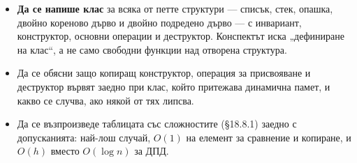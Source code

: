 \begin{itemize}
    \item \textbf{Да се напише клас} за всяка от петте структури --- списък, стек, опашка, двойно кореново дърво и двойно подредено дърво --- с инвариант, конструктор, основни операции и деструктор. Конспектът иска „дефиниране на клас“, а не само свободни функции над отворена структура.
    \item Да се обясни защо копиращ конструктор, операция за присвояване и деструктор вървят заедно при клас, който притежава динамична памет, и какво се случва, ако някой от тях липсва.
    \item Да се възпроизведе таблицата със сложностите (\S18.8.1) заедно с допусканията: най-лош случай, $O(1)$ на елемент за сравнение и копиране, и $O(h)$ вместо $O(\log n)$ за ДПД.
\end{itemize}
